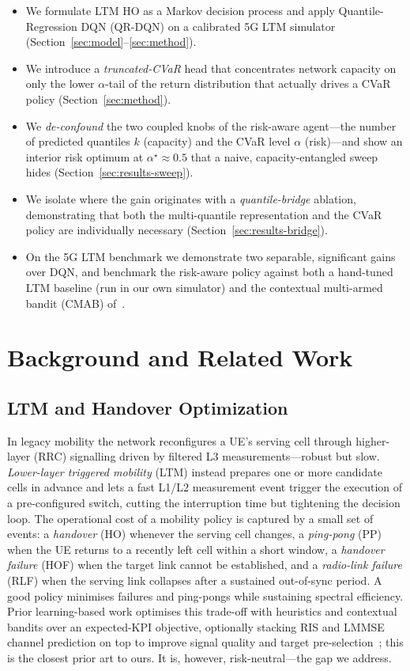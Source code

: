 \documentclass[conference]{IEEEtran}
\begin{document}
\begin{itemize}
  \item We formulate LTM HO as a Markov decision process and apply
  Quantile-Regression DQN (QR-DQN) on a calibrated 5G LTM simulator
  (Section~\ref{sec:model}--\ref{sec:method}).
  \item We introduce a \emph{truncated-CVaR} head that concentrates network
  capacity on only the lower $\alpha$-tail of the return distribution that
  actually drives a CVaR policy (Section~\ref{sec:method}).
  \item We \emph{de-confound} the two coupled knobs of the risk-aware
  agent---the number of predicted quantiles $k$ (capacity) and the CVaR level
  $\alpha$ (risk)---and show an interior risk optimum at $\alpha^\star\!\approx\!0.5$
  that a naive, capacity-entangled sweep hides (Section~\ref{sec:results-sweep}).
  \item We isolate where the gain originates with a \emph{quantile-bridge}
  ablation, demonstrating that both the multi-quantile representation and the
  CVaR policy are individually necessary (Section~\ref{sec:results-bridge}).
  \item On the 5G LTM benchmark we demonstrate two separable, significant gains
  over DQN, and benchmark the risk-aware policy against both a hand-tuned LTM
  baseline (run in our own simulator) and the contextual multi-armed bandit
  (CMAB) of~\cite{cmab_ho}.
\end{itemize}

\section{Background and Related Work}
\label{sec:related}

\subsection{LTM and Handover Optimization}
In legacy mobility the network reconfigures a UE's serving cell through
higher-layer (RRC) signalling driven by filtered L3 measurements---robust but
slow. \emph{Lower-layer triggered mobility} (LTM) instead prepares one or more
candidate cells in advance and lets a fast L1/L2 measurement event trigger the
execution of a pre-configured switch, cutting the interruption time but
tightening the decision loop. The operational cost of a mobility policy is
captured by a small set of events: a \emph{handover} (HO) whenever the serving
cell changes, a \emph{ping-pong} (PP) when the UE returns to a recently left
cell within a short window, a \emph{handover failure} (HOF) when the target
link cannot be established, and a \emph{radio-link failure} (RLF) when the
serving link collapses after a sustained out-of-sync period. A good policy
minimises failures and ping-pongs while sustaining spectral efficiency. Prior
learning-based work optimises this trade-off with heuristics and contextual
bandits over an expected-KPI objective, optionally stacking RIS and LMMSE
channel prediction on top to improve signal quality and target
pre-selection~\cite{cmab_ho}; this is the closest prior art to ours. It is,
however, risk-neutral---the gap we address.
\end{document}
